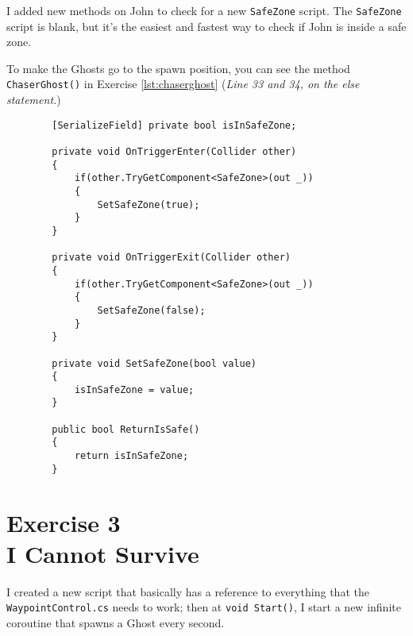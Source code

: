     I added new methods on John to check for a new \texttt{SafeZone} script. The \texttt{SafeZone} script is blank, but it's the easiest and fastest way to check if John is inside a safe zone.

    To make the Ghosts go to the spawn position, you can see the method \texttt{ChaserGhost()} in Exercise \ref{lst:chaserghost} (\textit{Line 33 and 34, on the else statement.})
    \begin{verbatim}
        [SerializeField] private bool isInSafeZone;

        private void OnTriggerEnter(Collider other)
        {
            if(other.TryGetComponent<SafeZone>(out _))
            {
                SetSafeZone(true);
            }
        }

        private void OnTriggerExit(Collider other)
        {
            if(other.TryGetComponent<SafeZone>(out _))
            {
                SetSafeZone(false);
            }
        }

        private void SetSafeZone(bool value)
        {
            isInSafeZone = value;
        }

        public bool ReturnIsSafe()
        {
            return isInSafeZone;
        }
    \end{verbatim}

\newpage
\section[Exercise 3. I Cannot Survive]{Exercise 3\\ {\large I Cannot Survive}}

    I created a new script that basically has a reference to everything that the \texttt{WaypointControl.cs} needs to work; then at \texttt{void Start()}, I start a new infinite coroutine that spawns a Ghost every second.

